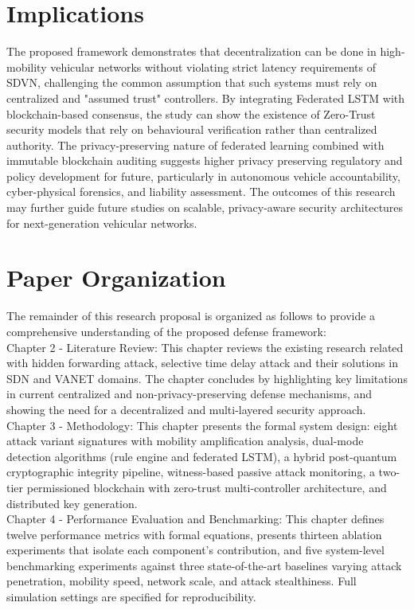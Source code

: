 \documentclass[12pt, a4paper]{report}
\begin{document}
\section{Implications}
The proposed framework demonstrates that decentralization can be done in high-mobility vehicular networks without violating strict latency requirements of SDVN, challenging the common assumption that such systems must rely on centralized and "assumed  trust" controllers. By integrating Federated LSTM with blockchain-based consensus, the study can show the existence of Zero-Trust security models that rely on behavioural verification rather than centralized authority. The privacy-preserving nature of federated learning combined with immutable blockchain auditing suggests higher privacy preserving regulatory and policy development for future, particularly in autonomous vehicle accountability, cyber-physical forensics, and liability assessment. The outcomes of this research may further guide future studies on scalable, privacy-aware security architectures for next-generation vehicular networks.

\section{Paper Organization}

The remainder of this research proposal is organized as follows to provide a comprehensive understanding of the proposed defense framework:
\\

Chapter 2 - Literature Review:
This chapter reviews the existing research related with hidden forwarding  attack, selective time delay attack and their solutions in SDN and VANET domains. The chapter concludes by highlighting key limitations in current centralized and non-privacy-preserving defense mechanisms, and showing  the need for a decentralized and multi-layered security approach.
\\ 

Chapter 3 - Methodology:
This chapter presents the formal system design:
eight attack variant signatures with mobility
amplification analysis, dual-mode detection
algorithms (rule engine and federated LSTM),
a hybrid post-quantum cryptographic integrity
pipeline, witness-based passive attack monitoring,
a two-tier permissioned blockchain with zero-trust
multi-controller architecture, and distributed key
generation.
\\

Chapter 4 - Performance Evaluation and Benchmarking:
This chapter defines twelve performance metrics with
formal equations, presents thirteen ablation
experiments that isolate each component's
contribution, and five system-level benchmarking
experiments against three state-of-the-art baselines
varying attack penetration, mobility speed, network
scale, and attack stealthiness. Full simulation
settings are specified for reproducibility.
\\
\end{document}
